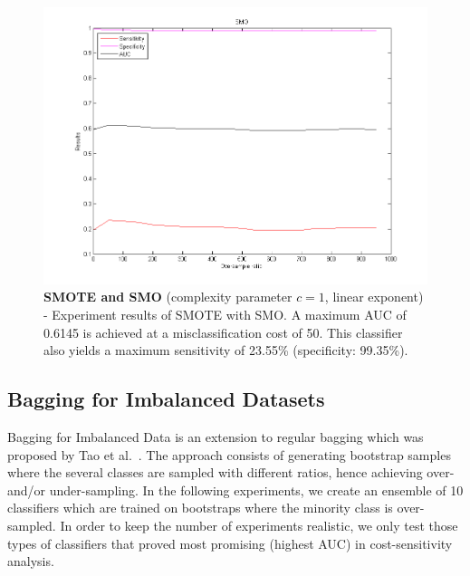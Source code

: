 \newpage
\begin{figure}[h]
\includegraphics[scale=0.65]{img/SMOTE_SMO.png}
\caption{\textbf{SMOTE and SMO} (complexity parameter $c = 1$, linear exponent) - Experiment results of SMOTE with SMO. A maximum AUC of 0.6145 is achieved at a  misclassification cost of 50. This classifier also yields a maximum sensitivity of 23.55\% (specificity: 99.35\%).}
\end{figure}

\newpage
\subsection{Bagging for Imbalanced Datasets}\label{exp-bagging}
Bagging for Imbalanced Data is an extension to regular bagging which was proposed by Tao et al.~\cite{1137548}. The approach consists of generating bootstrap samples where the several classes are sampled with different ratios, hence achieving over- and/or under-sampling. In the following experiments, we create an ensemble of 10 classifiers which are trained on bootstraps where the minority class is over-sampled. In order to keep the number of experiments realistic, we only test those types of classifiers that proved most promising (highest AUC) in cost-sensitivity analysis.

